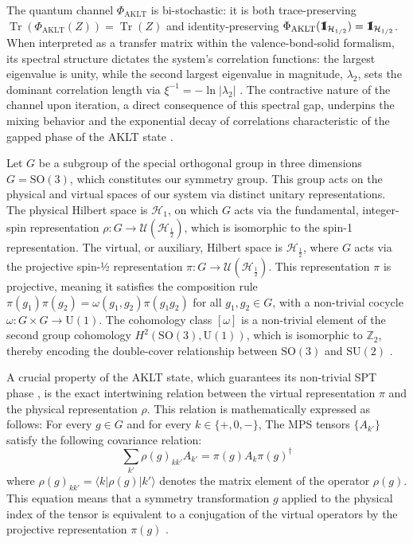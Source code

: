 \documentclass[12pt,a4paper]{article}
\def\id{{\bf 1}\!\!{\rm I}}
\begin{document}
The quantum channel $\Phi_{\mathrm{AKLT}}$ is bi-stochastic: it is both trace-preserving \(\operatorname{Tr}(\Phi_{\mathrm{AKLT}}(Z)) = \operatorname{Tr}(Z)\) and identity-preserving \(\Phi_{\mathrm{AKLT}}(\id_{\mathcal{H}_{1/2}}) = \id_{\mathcal{H}_{1/2}}\). When interpreted as a transfer matrix within the valence-bond-solid formalism, its spectral structure dictates the system's correlation functions: the largest eigenvalue is unity, while the second largest eigenvalue in magnitude, \(\lambda_2\), sets the dominant correlation length via \(\xi^{-1} = -\ln |\lambda_2|\) \cite{Pollmann2012}. The contractive nature of the channel upon iteration, a direct consequence of this spectral gap, underpins the mixing behavior and the exponential decay of correlations characteristic of the gapped phase of the AKLT state \cite{SA25}.



Let $G$ be a subgroup of the special orthogonal group in three dimensions $G = \mathrm{SO}(3)$, which constitutes our symmetry group. This group acts on the physical and virtual spaces of our system via distinct unitary representations. The physical Hilbert space is $\mathcal{H}_{1}$, on which $G$ acts via the fundamental, integer-spin representation $\rho: G \to \mathcal{U}(\mathcal{H}_{\frac{1}{2}})$, which is isomorphic to the spin-1 representation. The virtual, or auxiliary, Hilbert space is $\mathcal{H}_{\frac{1}{2}}$, where $G$ acts via the projective spin-½ representation $\pi: G \to \mathcal{U}(\mathcal{H}_{\frac{1}{2}})$. This representation $\pi$ is projective, meaning it satisfies the composition rule $\pi(g_1)\pi(g_2) = \omega(g_1,g_2)\pi(g_1g_2)$ for all $g_1, g_2 \in G$, with a non-trivial cocycle $\omega: G \times G \to \mathrm{U}(1)$. The cohomology class $[\omega]$ is a non-trivial element of the second group cohomology $H^2(\mathrm{SO}(3),\mathrm{U}(1))$, which is isomorphic to $\mathbb{Z}_2$, thereby encoding the double-cover relationship between $\mathrm{SO}(3)$ and $\mathrm{SU}(2)$ \cite{Chen2011b}.

A crucial property of the AKLT state, which guarantees its  non-trivial  SPT  phase  \cite{AKLT1987}, is the exact intertwining relation between the virtual representation $\pi$ and the physical representation $\rho$.  This relation is mathematically expressed as follows: For every $g \in G$ and for every  $k \in \{+, 0, -\}$, The MPS tensors $\{A_{k'}\}$ satisfy  the following covariance relation:
\begin{equation}\label{eq:Cov}
    \sum_{k'} \rho(g)_{k k'} A_{k'} = \pi(g) A_k \pi(g)^\dagger
\end{equation}
where $\rho(g)_{kk'} = \langle k | \rho(g) |k' \rangle$ denotes the matrix element of the operator $\rho(g)$. This equation means that a symmetry transformation $g$ applied to the physical index of the tensor is equivalent to a conjugation of the virtual operators by the projective representation $\pi(g)$ \cite{Pollmann2010}.
\end{document}
